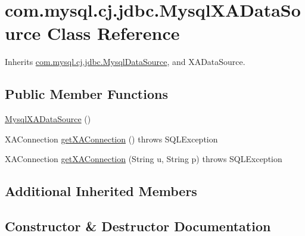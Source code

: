 \hypertarget{classcom_1_1mysql_1_1cj_1_1jdbc_1_1_mysql_x_a_data_source}{}\section{com.\+mysql.\+cj.\+jdbc.\+Mysql\+X\+A\+Data\+Source Class Reference}
\label{classcom_1_1mysql_1_1cj_1_1jdbc_1_1_mysql_x_a_data_source}


Inherits \mbox{\hyperlink{classcom_1_1mysql_1_1cj_1_1jdbc_1_1_mysql_data_source}{com.\+mysql.\+cj.\+jdbc.\+Mysql\+Data\+Source}}, and X\+A\+Data\+Source.

\subsection*{Public Member Functions}
\begin{DoxyCompactItemize}
\item 
\mbox{\hyperlink{classcom_1_1mysql_1_1cj_1_1jdbc_1_1_mysql_x_a_data_source_a649cdd9205bc8bc9b10ecfaffb308dbf}{Mysql\+X\+A\+Data\+Source}} ()
\item 
X\+A\+Connection \mbox{\hyperlink{classcom_1_1mysql_1_1cj_1_1jdbc_1_1_mysql_x_a_data_source_a65a05cf6199e72104171cc0715f0bda1}{get\+X\+A\+Connection}} ()  throws S\+Q\+L\+Exception 
\item 
X\+A\+Connection \mbox{\hyperlink{classcom_1_1mysql_1_1cj_1_1jdbc_1_1_mysql_x_a_data_source_a3676067146a4876a9a368420d2f030fc}{get\+X\+A\+Connection}} (String u, String p)  throws S\+Q\+L\+Exception 
\end{DoxyCompactItemize}
\subsection*{Additional Inherited Members}


\subsection{Constructor \& Destructor Documentation}
\mbox{\label{classcom_1_1mysql_1_1cj_1_1jdbc_1_1_mysql_x_a_data_source_a649cdd9205bc8bc9b10ecfaffb308dbf}} 
